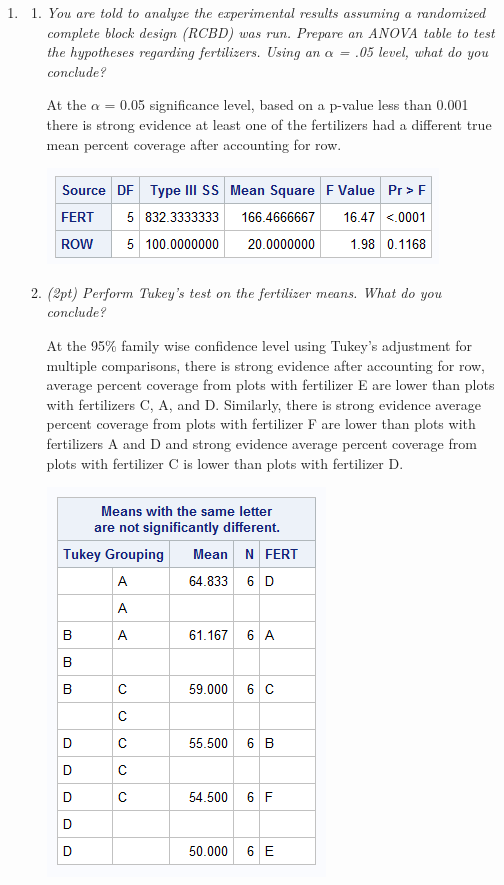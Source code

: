 \documentclass{article}\usepackage[]{graphicx}\usepackage[]{color}
\begin{document}
\begin{enumerate}

\item
\begin{enumerate}
\item %

{\it You are told to analyze the experimental results assuming a randomized complete block design (RCBD) was run. Prepare an ANOVA table to test the hypotheses regarding fertilizers. Using an $\alpha$ = .05 level, what do you conclude?}

At the $\alpha$ = 0.05 significance level, based on a p-value less than 0.001 there is strong evidence at least one of the fertilizers had a different true mean percent coverage after accounting for row.

\begin{center}
\includegraphics{prob1a}
\end{center}

\item 
{\it (2pt) Perform Tukey's test on the fertilizer means. What do you conclude?}

At the 95\% family wise confidence level using Tukey's adjustment for multiple comparisons, there is strong evidence after accounting for row, average percent coverage from plots with fertilizer E are lower than plots with fertilizers C, A, and D. Similarly, there is strong evidence average percent coverage from plots with fertilizer F are lower than plots with fertilizers A and D and strong evidence average percent coverage from plots with fertilizer C is lower than plots with fertilizer D.

\begin{center}
\includegraphics{prob1b}
\end{center}


\end{enumerate}
\end{enumerate}
\end{document}
